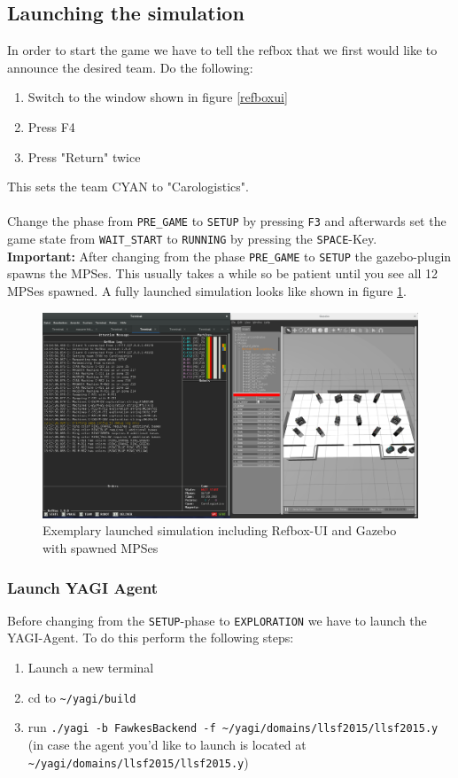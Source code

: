 \documentclass[oribibl]{llncs}
\begin{document}
\subsection{Launching the simulation}
In order to start the game we have to tell the refbox that we first would like to announce the desired team. Do the following:
\begin{enumerate}
        \item Switch to the window shown in figure \ref{refboxui}
        \item Press F4
        \item Press "Return" twice
\end{enumerate}
This sets the team CYAN to "Carologistics".\\
\\
Change the phase from \texttt{PRE\_GAME} to \texttt{SETUP} by pressing \texttt{F3} and afterwards set the game state from \texttt{WAIT\_START} to \texttt{RUNNING} by pressing the \texttt{SPACE}-Key.\\
\textbf{Important:} After changing from the phase \texttt{PRE\_GAME} to \texttt{SETUP} the gazebo-plugin spawns the MPSes. This usually takes a while so be patient until you see all 12 MPSes spawned. A fully launched simulation looks like shown in figure \ref{simulaunchfull}.
\begin{figure}
        \centering
        \includegraphics[width=\textwidth]{images/simulaunchfull.png}
        \caption{Exemplary launched simulation including Refbox-UI and Gazebo with spawned MPSes}
        \label{simulaunchfull}
\end{figure}

\subsubsection{Launch YAGI Agent}
Before changing from the \texttt{SETUP}-phase to \texttt{EXPLORATION} we have to launch the YAGI-Agent.
To do this perform the following steps:
\begin{enumerate}
        \item Launch a new terminal
        \item cd to \texttt{\textasciitilde/yagi/build}
        \item run \texttt{./yagi -b FawkesBackend -f \textasciitilde/yagi/domains/llsf2015/llsf2015.y} (in case the agent you'd like to launch is located at\\ \texttt{\textasciitilde/yagi/domains/llsf2015/llsf2015.y})
\end{enumerate}
\end{document}
